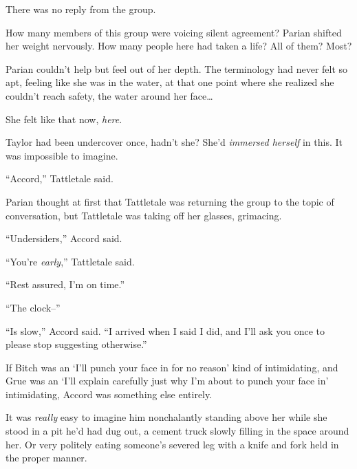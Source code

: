 There was no reply from the group.



How many members of this group were voicing silent agreement?  Parian shifted her weight nervously.  How many people here had taken a life?  All of them?  Most?



Parian couldn't help but feel out of her depth.  The terminology had never felt so apt, feeling like she was in the water, at that one point where she realized she couldn't reach safety, the water around her face\ldots



She felt like that now, \emph{here}.



Taylor had been undercover once, hadn't she?  She'd \emph{immersed herself} in this.  It was impossible to imagine.



``Accord,'' Tattletale said.



Parian thought at first that Tattletale was returning the group to the topic of conversation, but Tattletale was taking off her glasses, grimacing.



``Undersiders,'' Accord said.



``You're \emph{early},'' Tattletale said.



``Rest assured, I'm on time.''



``The clock--''



``Is slow,'' Accord said.  ``I arrived when I said I did, and I'll ask you once to please stop suggesting otherwise.''



If Bitch was an `I'll punch your face in for no reason' kind of intimidating, and Grue was an `I'll explain carefully just why I'm about to punch your face in' intimidating, Accord was something else entirely.



It was \emph{really} easy to imagine him nonchalantly standing above her while she stood in a pit he'd had dug out, a cement truck slowly filling in the space around her.  Or very politely eating someone's severed leg with a knife and fork held in the proper manner.



